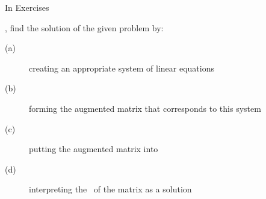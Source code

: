 {In Exercises}
{, find the solution of the given problem by:
\begin{description}
\item		[(a)]creating an appropriate system of linear equations
\item		[(b)]forming the augmented matrix that corresponds to this system
\item		[(c)]putting the augmented matrix into \rref
\item		[(d)]interpreting the \rref\ of the matrix as a solution
\end{description}}
